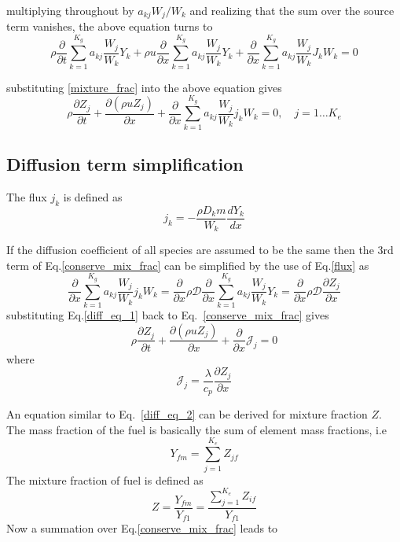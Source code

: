  multiplying throughout by $a_{kj}W_j/W_k$ and realizing that the sum over the source term vanishes, the above equation turns to
 \begin{equation}
  \rho \frac{\partial}{\partial t}\sum_{k=1}^{K_g} a_{kj} \frac{W_j}{W_k}Y_k + 
  \rho u \frac{\partial}{\partial x}\sum_{k=1}^{K_g} a_{kj} \frac{W_j}{W_k}Y_k +
 \frac{\partial}{\partial x}\sum_{k=1}^{K_g} a_{kj} \frac{W_j}{W_k}J_kW_k = 0
 \end{equation}
 
substituting  \ref{mixture_frac} into the above equation gives
\begin{equation}
 \rho \frac{\partial Z_j}{\partial t} + \frac{\partial (\rho u Z_j) }{\partial x} + \frac{\partial }{\partial x} \sum_{k=1}^{K_g} a_{kj}\frac{W_j}{W_k}j_kW_k=0, \quad j=1\ldots K_e
\label{conserve_mix_frac}
\end{equation}

\subsection{Diffusion term simplification}
The flux $j_k$ is defined as
\begin{equation}
 j_k = -\frac{\rho D_km}{W_k}\frac{dY_k}{dx}
\label{flux}
\end{equation}

If the diffusion coefficient of all species are assumed to be the same then the 3rd term of Eq.\ref{conserve_mix_frac} can be simplified by the use of Eq.\ref{flux} as
\begin{equation}
 \frac{\partial }{\partial x}\sum_{k=1}^{K_g} a_{kj} \frac{W_j}{W_k}j_kW_k = \frac{\partial }{\partial x}\rho \mathcal{D} \frac{\partial }{\partial x}\sum_{k=1}^{K_g} a_{kj} \frac{W_j}{W_k}Y_k = \frac{\partial }{\partial x}\rho \mathcal{D} \frac{\partial Z_j}{\partial x}
\label{diff_eq_1}
\end{equation}
substituting Eq.\ref{diff_eq_1} back to Eq.~\ref{conserve_mix_frac} gives
\begin{equation}
 \rho \frac{\partial Z_j}{\partial t} + \frac{\partial (\rho u Z_j)}{\partial x} + \frac{\partial}{\partial x}\mathcal{J}_j = 0
\label{diff_eq_2}
\end{equation}
where 
\begin{equation}
 \mathcal{J}_j = \frac{\lambda}{c_p}\frac{\partial Z_j}{\partial x}
\end{equation}

 An equation similar to Eq.~\ref{diff_eq_2} can be derived for mixture fraction $Z$. The mass fraction of the fuel is basically the sum of element mass fractions, i.e
\begin{equation}
 Y_{fm} = \sum_{j=1}^{K_e} Z_{jf}
\end{equation}
The mixture fraction of fuel is defined as 
\begin{equation}
 Z = \frac{Y_{fm}}{Y_{f1}} = \frac{\sum_{j=1}^{K_e}Z_{if}}{Y_{f1}}
\end{equation}
Now a summation over Eq.\ref{conserve_mix_frac} leads to

